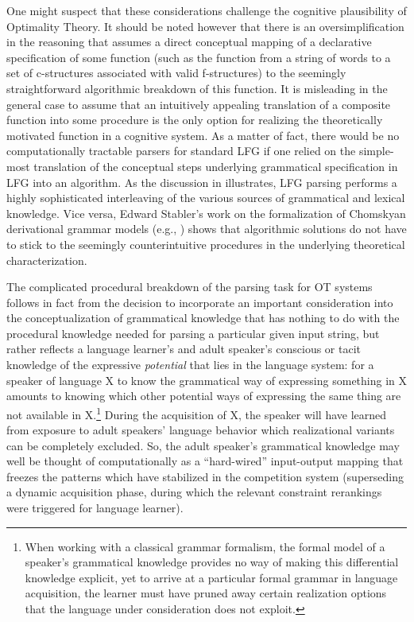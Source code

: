 \documentclass[output=paper,hidelinks]{langscibook}
\begin{document}
One might suspect that these considerations challenge the cognitive plausibility of Optimality Theory. It should be noted however that there is an oversimplification in the reasoning that assumes a direct conceptual mapping of a declarative specification of some function (such as the function from a string of words to a set of c-structures associated with valid f-structures) to the seemingly straightforward algorithmic breakdown of this function.
It is misleading in the general case to assume that an intuitively appealing translation of a composite function into some procedure is the only option for realizing the theoretically motivated function in a cognitive system. As a matter of fact, there would be no computationally tractable parsers for standard LFG if one relied on the simple-most translation of the conceptual steps underlying grammatical specification in LFG into an algorithm. 
As the discussion in \citet{maxwellkaplan96} illustrates, LFG parsing performs a highly sophisticated interleaving of the various sources of grammatical and lexical knowledge. Vice versa, Edward Stabler's work on the formalization of Chomskyan derivational grammar models (e.g., \citealt{Stabler2011,Stabler2013}) shows that algorithmic solutions do not have to stick to the seemingly counterintuitive procedures in the underlying theoretical characterization. %

The complicated procedural breakdown of the parsing task for OT systems follows in fact from the decision to incorporate an important consideration into the conceptualization of grammatical knowledge that has nothing to do with the procedural knowledge needed for parsing a particular given input string, but rather reflects a language learner's and adult speaker's conscious or tacit knowledge of the expressive \emph{potential} that lies in the language system: for a speaker of language X to know the grammatical way of expressing something in X amounts to knowing which other potential ways of expressing the same thing are not available in X.\footnote{When working with a classical grammar formalism, the formal model of a speaker's grammatical knowledge provides no way of making this differential knowledge explicit, yet to arrive at a particular formal grammar in language acquisition, the learner must have pruned away certain realization options that the language under consideration does not exploit.} During the acquisition of X, the speaker will have learned from exposure to adult speakers' language behavior which realizational variants can be completely excluded. So, the adult speaker's grammatical knowledge may well be thought of computationally as a ``hard-wired'' input-output mapping that freezes the patterns which have stabilized in the competition system (superseding a dynamic acquisition phase, during which the relevant constraint rerankings were triggered for language learner).
\end{document}
